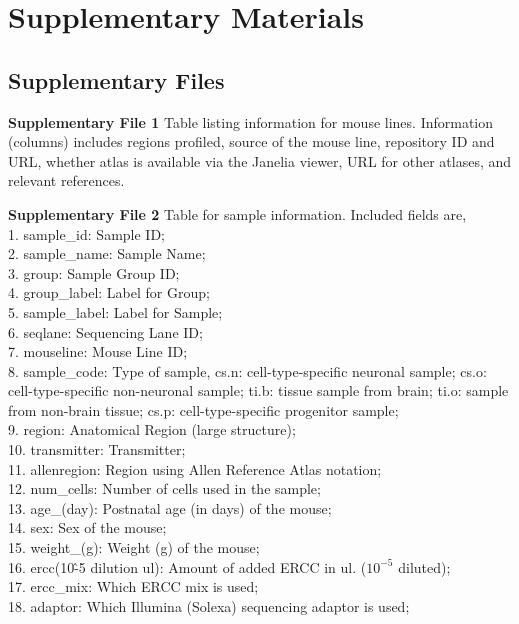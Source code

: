 \section{Supplementary Materials}

\subsection{Supplementary Files} 

\textbf{Supplementary File 1} Table listing information for mouse lines. Information (columns) includes regions profiled, source of the mouse line, repository ID and URL, whether atlas is available via the Janelia viewer, URL for other atlases, and relevant references.

\textbf{Supplementary File 2} Table for sample information. Included fields are, \\
1. sample\_id: Sample ID; \\
2. sample\_name: Sample Name; \\ 
3. group: Sample Group ID; \\
4. group\_label: Label for Group; \\
5. sample\_label: Label for Sample;  \\
6. seqlane: Sequencing Lane ID; \\
7. mouseline: Mouse Line ID; \\
8. sample\_code: Type of sample, cs.n: cell-type-specific neuronal sample; cs.o: cell-type-specific non-neuronal sample; ti.b: tissue sample from brain; ti.o: sample from non-brain tissue; cs.p: cell-type-specific progenitor sample; \\
9. region: Anatomical Region (large structure); \\
10. transmitter: Transmitter; \\
11. allenregion: Region using Allen Reference Atlas notation; \\
12. num\_cells: Number of cells used in the sample; \\
13. age\_(day): Postnatal age (in days) of the mouse; \\
14. sex: Sex of the mouse; \\
15. weight\_(g): Weight (g) of the mouse; \\
16. ercc(10\^-5 dilution ul): Amount of added ERCC in ul. ($10^{-5}$ diluted); \\
17. ercc\_mix: Which ERCC mix is used; \\
18. adaptor: Which Illumina (Solexa) sequencing adaptor is used; \\

